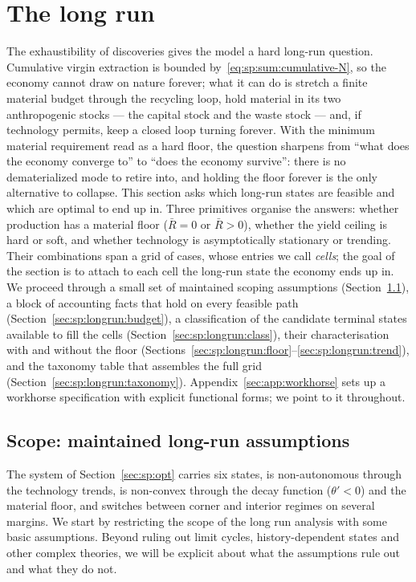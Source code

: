 \section{The long run}\label{sec:sp:longrun}

The exhaustibility of discoveries gives the model a hard long-run question. Cumulative virgin extraction is bounded by~\eqref{eq:sp:sum:cumulative-N}, so the economy cannot draw on nature forever; what it can do is stretch a finite material budget through the recycling loop, hold material in its two anthropogenic stocks --- the capital stock and the waste stock --- and, if technology permits, keep a closed loop turning forever. With the minimum material requirement read as a hard floor, the question sharpens from ``what does the economy converge to'' to ``does the economy survive'': there is no dematerialized mode to retire into, and holding the floor forever is the only alternative to collapse. This section asks which long-run states are feasible and which are optimal to end up in. Three primitives organise the answers: whether production has a material floor ($\bar R=0$ or $\bar R>0$), whether the yield ceiling is hard or soft, and whether technology is asymptotically stationary or trending. Their combinations span a grid of cases, whose entries we call \emph{cells}; the goal of the section is to attach to each cell the long-run state the economy ends up in. We proceed through a small set of maintained scoping assumptions (Section~\ref{sec:sp:longrun:scope}), a block of accounting facts that hold on every feasible path (Section~\ref{sec:sp:longrun:budget}), a classification of the candidate terminal states available to fill the cells (Section~\ref{sec:sp:longrun:class}), their characterisation with and without the floor (Sections~\ref{sec:sp:longrun:floor}--\ref{sec:sp:longrun:trend}), and the taxonomy table that assembles the full grid (Section~\ref{sec:sp:longrun:taxonomy}). Appendix~\ref{sec:app:workhorse} sets up a workhorse specification with explicit functional forms; we point to it throughout.

\subsection{Scope: maintained long-run assumptions}\label{sec:sp:longrun:scope}

The system of Section~\ref{sec:sp:opt} carries six states, is non-autonomous through the technology trends, is non-convex through the decay function ($\theta'<0$) and the material floor, and switches between corner and interior regimes on several margins. We start by restricting the scope of the long run analysis with some basic assumptions. Beyond ruling out limit cycles, history-dependent states and other complex theories, we will be explicit about what the assumptions rule out and what they do not.

